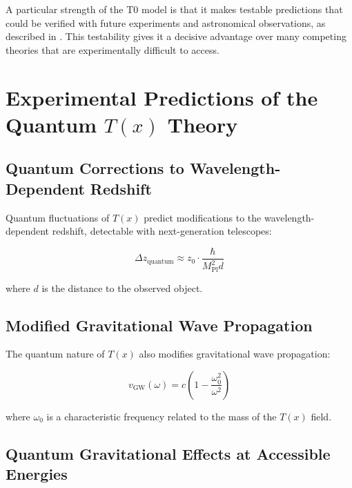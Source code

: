 \documentclass[12pt,a4paper]{article}
\newcommand{\Tfield}{T(x)}
\begin{document}
	\begin{tcolorbox}[colback=blue!5!white,colframe=blue!75!black,title=Advantage Over Competing Approaches]
		A particular strength of the T0 model is that it makes testable predictions that could be verified with future experiments and astronomical observations, as described in \cite{pascher_vereinheitlichung_2025_en}. This testability gives it a decisive advantage over many competing theories that are experimentally difficult to access.
	\end{tcolorbox}
	
	\section{Experimental Predictions of the Quantum $\Tfield$ Theory}
	\label{sec:experimentelle_vorhersagen}
	
	\subsection{Quantum Corrections to Wavelength-Dependent Redshift}
	\label{sec:quantenkorrekturen_rotverschiebung}
	
	Quantum fluctuations of $\Tfield$ predict modifications to the wavelength-dependent redshift, detectable with next-generation telescopes:
	
	\begin{equation}
		\Delta z_{\text{quantum}} \approx z_0 \cdot \frac{\hbar}{M_{\text{Pl}}^2 d}
	\end{equation}
	
	where $d$ is the distance to the observed object.
	
	\subsection{Modified Gravitational Wave Propagation}
	\label{sec:gravitationswellen}
	
	The quantum nature of $\Tfield$ also modifies gravitational wave propagation:
	
	\begin{equation}
		v_{\text{GW}}(\omega) = c\left(1 - \frac{\omega_0^2}{\omega^2}\right)
	\end{equation}
	
	where $\omega_0$ is a characteristic frequency related to the mass of the $\Tfield$ field.
	
	\subsection{Quantum Gravitational Effects at Accessible Energies}
	\label{sec:quantengravitative_effekte}
	
\end{document}
